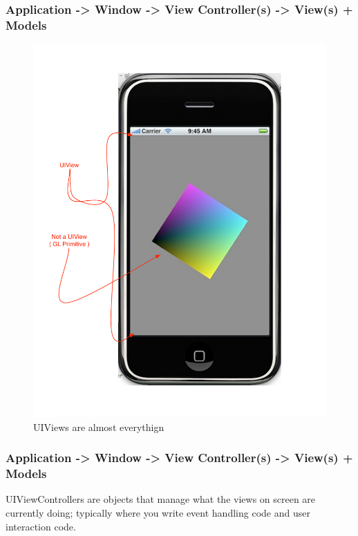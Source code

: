 \documentclass[10pt]{beamer}
\begin{document}
\begin{frame}[fragile]
  \frametitle{Application -> Window -> View Controller(s) -> View(s) + Models}
  \begin{figure}[htb]
  \begin{center}
  
  \includegraphics[scale=0.35]{UIViewExample2.pdf}
              
  \caption{UIViews are almost everythign}
  \end{center}
  \end{figure}

\end{frame}

\begin{frame}[fragile]
  \frametitle{Application -> Window -> View Controller(s) -> View(s) + Models}
  UIViewControllers are objects that manage what the views on screen are currently doing; typically where you write event handling code and user interaction code.

\end{frame}
\end{document}

